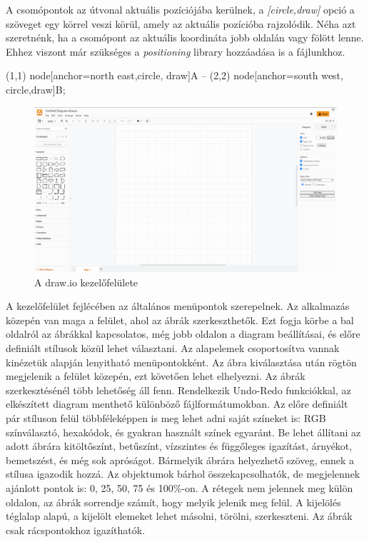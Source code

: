 \noindent
A csomópontok az útvonal aktuális pozíciójába kerülnek, a \textit{[circle,draw]} opció a szöveget egy körrel veszi körül, amely az aktuális pozícióba rajzolódik.
Néha azt szeretnénk, ha a csomópont az aktuális koordináta jobb oldalán vagy fölött lenne. Ehhez viszont már szükséges a \textit{positioning} library hozzáadása is a fájlunkhoz.

\begin{tikzcode}
\draw 
(1,1) node[anchor=north east,circle, draw]{A} 
	-- 
(2,2) node[anchor=south west, circle,draw]{B}; 
\end{tikzcode}






\begin{figure}[!h]
	\includegraphics[width=\textwidth]{images/drawio.png}
	\caption{A draw.io kezelőfelülete \cite{drawio}}
\label{fig:drawio}
\end{figure}
A kezelőfelület fejlécében az általános menüpontok szerepelnek. Az alkalmazás közepén van maga a felület, ahol az ábrák szerkeszthetők. Ezt fogja körbe a bal oldalról az ábrákkal kapcsolatos, még jobb oldalon a diagram beállításai, és előre definiált stílusok közül lehet választani. Az alapelemek csoportosítva vannak kinézetük alapján lenyitható menüpontokként. Az ábra kiválasztása után rögtön megjelenik a felület közepén, ezt követően lehet elhelyezni. Az ábrák szerkesztésénél több lehetőség áll fenn. Rendelkezik Undo-Redo funkciókkal, az elkészített diagram menthető különböző fájlformátumokban. Az előre definiált pár stíluson felül többféleképpen is meg lehet adni saját színeket is: RGB színválasztó, hexakódok, és gyakran használt színek egyaránt. Be lehet állítani az adott ábrára kitöltőszínt, betűszínt, vízszintes és függőleges igazítást, árnyékot, bemetszést, és még sok apróságot. Bármelyik ábrára helyezhető szöveg, ennek a stílusa igazodik hozzá. Az objektumok bárhol összekapcsolhatók, de megjelennek ajánlott pontok is: 0, 25, 50, 75 és 100\%-on. A rétegek nem jelennek meg külön oldalon, az ábrák sorrendje számít, hogy melyik jelenik meg felül. A kijelölés téglalap alapú, a kijelölt elemeket lehet másolni, törölni, szerkeszteni. Az ábrák csak rácspontokhoz igazíthatók.


